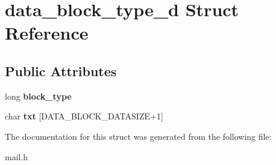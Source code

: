\hypertarget{structdata__block__type__d}{}\section{data\+\_\+block\+\_\+type\+\_\+d Struct Reference}
\label{structdata__block__type__d}
\subsection*{Public Attributes}
\begin{DoxyCompactItemize}
\item 
\mbox{\label{structdata__block__type__d_a8fe97da27b159387f859ecc0c94a926d}} 
long {\bfseries block\+\_\+type}
\item 
\mbox{\label{structdata__block__type__d_a8a72beebbad5618bf5a15f855770172c}} 
char {\bfseries txt} \mbox{[}D\+A\+T\+A\+\_\+\+B\+L\+O\+C\+K\+\_\+\+D\+A\+T\+A\+S\+I\+ZE+1\mbox{]}
\end{DoxyCompactItemize}


The documentation for this struct was generated from the following file\+:\begin{DoxyCompactItemize}
\item 
mail.\+h\end{DoxyCompactItemize}
